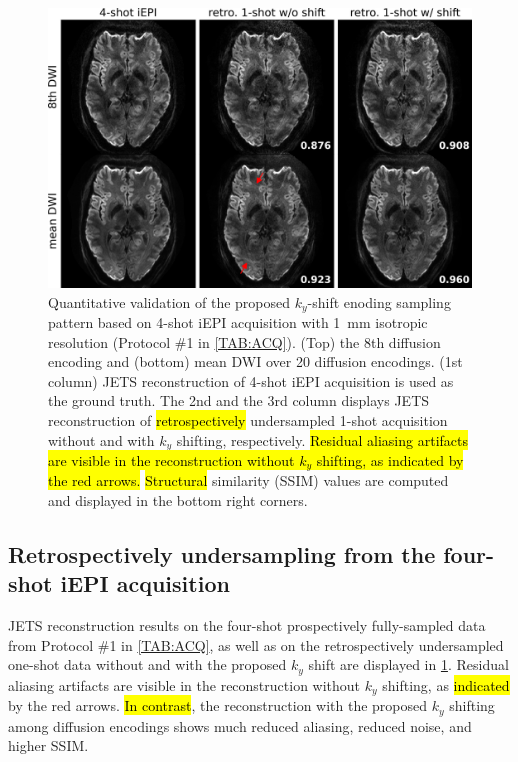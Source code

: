 \documentclass[preprint,12pt,authoryear,review]{elsarticle}
\begin{document}
    \begin{figure}
        \centering
        \includegraphics[width=\textwidth]{../figures/fig5.png}
        \caption{Quantitative validation of the proposed
        $k_y$-shift enoding sampling pattern
        based on 4-shot iEPI acquisition with 1~mm isotropic resolution
        (Protocol \#1 in \cref{TAB:ACQ}).
        (Top) the 8th diffusion encoding and
        (bottom) mean DWI over 20 diffusion encodings.
        (1st column) JETS reconstruction of 4-shot iEPI acquisition
        is used as the ground truth.
        The 2nd and the 3rd column displays JETS reconstruction
        of \hl{retrospectively} undersampled
        1-shot acquisition without and with $k_y$ shifting,
        respectively.
        \hl{Residual aliasing artifacts are visible in the reconstruction
        without $k_y$ shifting, as indicated by the red arrows.}
        \hl{Structural} similarity (SSIM) values are computed and
        displayed in the bottom right corners.}
        \label{FIG:retro}
    \end{figure}

    \subsection{Retrospectively undersampling from the four-shot iEPI acquisition}

    JETS reconstruction results on
    the four-shot prospectively fully-sampled data
    from Protocol \#1 in \cref{TAB:ACQ},
    as well as on the retrospectively undersampled one-shot data
    without and with the proposed $k_y$ shift
    are displayed in \cref{FIG:retro}.
    Residual aliasing artifacts are visible in the reconstruction
    without $k_y$ shifting, as \hl{indicated} by the red arrows.
    \hl{In contrast}, the reconstruction
    with the proposed $k_y$ shifting among diffusion encodings
    shows much reduced aliasing, reduced noise, and higher SSIM.
\end{document}
